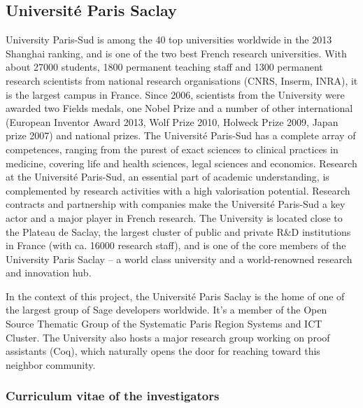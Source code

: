 \subsection*{Université Paris Saclay}

University Paris-Sud is among the 40 top universities worldwide in the
2013 Shanghai ranking, and is one of the two best French research
universities. With about 27000 students, 1800 permanent teaching staff
and 1300 permanent research scientists from national research
organisations (CNRS, Inserm, INRA), it is the largest campus in
France. Since 2006, scientists from the University were awarded two
Fields medals, one Nobel Prize and a number of other international
(European Inventor Award 2013, Wolf Prize 2010, Holweck Prize 2009,
Japan prize 2007) and national prizes.  The Université Paris-Sud has a
complete array of competences, ranging from the purest of exact
sciences to clinical practices in medicine, covering life and health
sciences, legal sciences and economics. Research at the Université
Paris-Sud, an essential part of academic understanding, is
complemented by research activities with a high valorisation
potential. Research contracts and partnership with companies make the
Université Paris-Sud a key actor and a major player in French
research.  The University is located close to the Plateau de Saclay,
the largest cluster of public and private R\&D institutions in France
(with ca. 16000 research staff), and is one of the core members of the
University Paris Saclay – a world class university and a
world-renowned research and innovation hub.

In the context of this project, the Université Paris Saclay is the
home of one of the largest group of Sage developers worldwide. It's a
member of the Open Source Thematic Group of the Systematic Paris
Region Systems and ICT Cluster. The University also hosts a major
research group working on proof assistants (Coq), which naturally
opens the door for reaching toward this neighbor community.


\subsubsection*{Curriculum vitae of the investigators}

%

%



